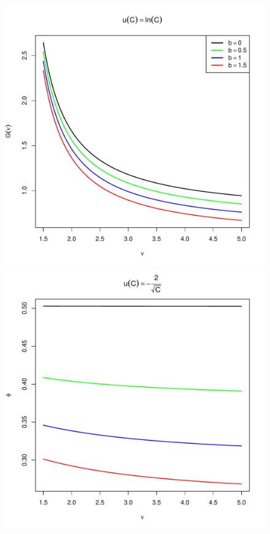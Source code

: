\documentclass[11pt,a4]{amsart}
\newcommand{\1}{{\mathbf 1}}
\begin{document}
\begin{figure}[htb!]
\begin{minipage}{0.5\linewidth}
  \end{minipage}\hfill
  \begin{minipage}{0.5\linewidth}
    \includegraphics[width=\textwidth]{U_b_t_log.pdf}
  \end{minipage}
  \begin{minipage}{0.5\linewidth}
    \includegraphics[width=\textwidth]{phi_hat_b_t_power.pdf}

\end{minipage}
\end{figure}
\end{document}
